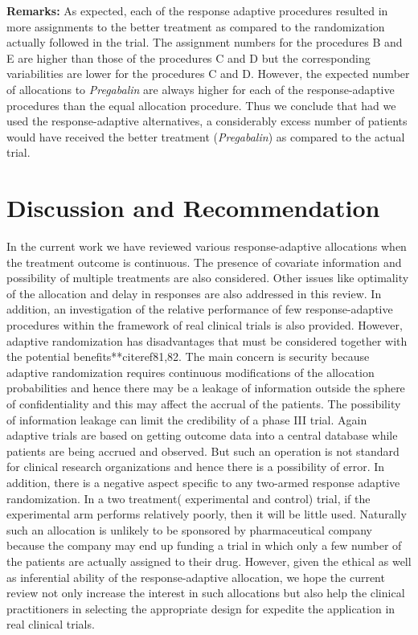 \noindent\textbf{Remarks:} As expected, each of the response adaptive procedures resulted in more assignments to the better treatment as compared to the randomization actually followed in the trial. The assignment numbers for the procedures B and E are  higher than those of the procedures C and D  but the corresponding variabilities are lower for the procedures C and D. However, the expected number of allocations to \textit{Pregabalin} are always higher  for  each of  the response-adaptive procedures than the equal allocation procedure. Thus we conclude that had we used the  response-adaptive alternatives,  a considerably excess number of patients would have received the better treatment (\textit{Pregabalin}) as compared to the actual trial.

\section{Discussion and Recommendation}

In the current work we have reviewed various response-adaptive allocations when the treatment outcome is continuous. The presence of covariate information and  possibility of multiple treatments  are also considered. Other issues like optimality of the allocation and delay in responses are also addressed in this review. In addition, an investigation of the relative performance of few response-adaptive procedures within the framework of real clinical trials  is also provided. However, adaptive randomization has disadvantages that must be considered together with the potential benefits**citeref{81,82}. The main  concern is security because adaptive randomization requires continuous modifications of the allocation probabilities and hence there may be a leakage of information  outside the sphere of confidentiality and this may affect the accrual of the patients.  The possibility of information leakage can limit the credibility of a phase III trial. Again adaptive trials are based on getting outcome data into a central database while patients are being accrued and observed. But such an operation is not standard for clinical research organizations  and hence there is a possibility of error. In addition, there is a negative aspect specific to any  two-armed response adaptive randomization. In a two treatment( experimental and control) trial, if the experimental arm performs relatively poorly, then it
will be little used. Naturally such an allocation is unlikely to
be sponsored by pharmaceutical company because the company may end up funding a trial in which only a few number of the patients are actually assigned to their drug.  However, given the ethical as well as inferential ability of the response-adaptive allocation, we hope the current review  not only  increase the interest in such allocations but also help the clinical practitioners in selecting the appropriate design for expedite the application in real clinical trials.\\